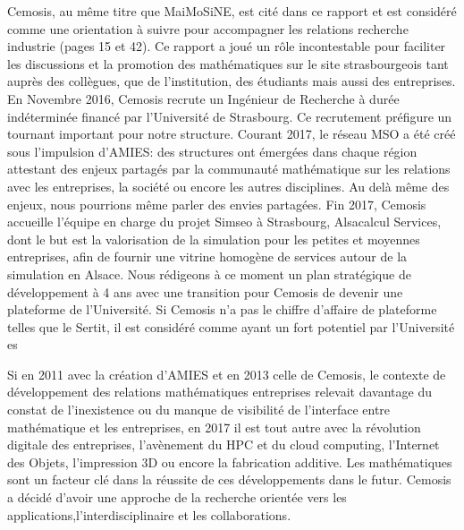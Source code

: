 Cemosis, au même titre que MaiMoSiNE, est cité dans ce rapport et est considéré comme une orientation à suivre pour accompagner les relations recherche industrie (pages 15 et 42). 
Ce rapport a joué un rôle incontestable pour faciliter les discussions et la promotion des mathématiques sur le site strasbourgeois tant auprès des collègues, que de l'institution, des étudiants mais aussi des entreprises.
En Novembre 2016, Cemosis recrute un Ingénieur de Recherche à durée indéterminée financé par l'Université de Strasbourg. Ce recrutement préfigure un tournant important pour notre structure.
Courant 2017, le réseau MSO a été créé sous l'impulsion d'AMIES: des structures ont émergées dans chaque région attestant des enjeux partagés par la communauté mathématique sur les relations avec les entreprises, la société ou encore les autres disciplines. 
Au delà même des enjeux, nous pourrions même parler des envies partagées.
Fin 2017, Cemosis accueille l'équipe en charge du projet Simseo à Strasbourg, Alsacalcul Services, dont le but est la valorisation de la simulation pour les petites et moyennes entreprises, afin de fournir une vitrine homogène de services autour de la simulation en Alsace.
Nous rédigeons à ce moment un plan stratégique de développement à 4 ans avec une transition pour Cemosis de devenir une plateforme de l'Université. Si Cemosis n'a pas le chiffre d'affaire de plateforme telles que le Sertit, il est considéré comme ayant un fort potentiel par l'Université es

Si en 2011 avec la création d'AMIES et en 2013 celle de Cemosis, le contexte de développement des relations mathématiques entreprises relevait davantage du constat de l'inexistence ou du manque de visibilité de l'interface entre mathématique et les entreprises, en 2017 il est tout autre avec la révolution digitale des entreprises, l'avènement du HPC et du cloud computing, l'Internet des Objets, l'impression 3D ou encore la fabrication additive. Les mathématiques sont un facteur clé dans la réussite de ces développements dans le futur. Cemosis a décidé d'avoir une approche de la recherche orientée vers les applications,l'interdisciplinaire et les collaborations.
 
 

\vspace{1cm}